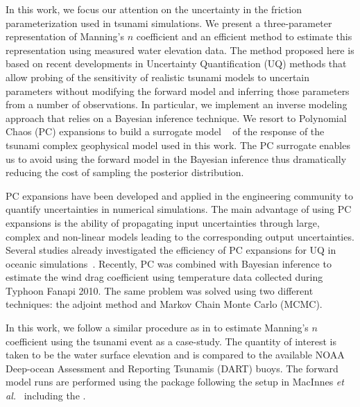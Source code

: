 In this work, we focus our attention on the uncertainty in the friction
parameterization used in tsunami simulations. We present a three-parameter 
representation of Manning's $n$ coefficient and an efficient method
to estimate this representation using measured water elevation data. The method proposed here 
is based on recent developments in Uncertainty Quantification (UQ) methods that allow 
probing of the sensitivity of realistic tsunami  models to uncertain parameters
without modifying the forward model and inferring those parameters
from a number of observations.  In particular, we implement an inverse modeling
approach that relies on a Bayesian inference technique.  We resort to
Polynomial Chaos (PC) expansions to build a surrogate model ~\cite{Najm:2009,Alexanderian2012,Elsheikh2014,Young2013}
of the response of the tsunami complex geophysical model \geoclaw used in this work.
The PC surrogate enables us to avoid using the forward model in
the Bayesian inference thus dramatically reducing the cost of sampling the
posterior distribution.

PC expansions have been developed and applied in the engineering community to
quantify uncertainties in numerical simulations.  The main advantage of
using PC expansions is the ability of propagating input uncertainties through 
large, complex and non-linear models leading to the corresponding output uncertainties. 
Several studies already investigated the efficiency of PC expansions for 
UQ in oceanic simulations~\citep{thacker2012,ashwanth2010,Alexanderian2012,sraj:2013a}. 
Recently, PC was combined with Bayesian inference to estimate the wind drag coefficient 
using temperature data collected during Typhoon Fanapi 2010. The same problem was 
solved using two different techniques: the adjoint method and Markov Chain Monte Carlo
(MCMC)\cite{sraj:2013a,sraj:2013b}.

In this work, we follow a similar procedure as in \cite{sraj:2013a,sraj:2013b}
to estimate Manning's $n$ coefficient using the \tohoku tsunami
event as a case-study. The quantity of interest is taken to be the water surface
elevation and is compared to the available NOAA Deep-ocean Assessment and
Reporting Tsunamis (DART) buoys.  The forward model runs are performed using the
\geoclaw package following the setup in MacInnes \emph{et al.}~\cite{MacInnes:2013cr} 
including the .


